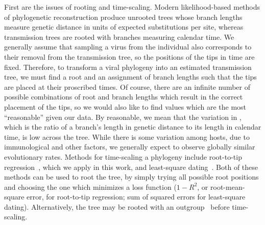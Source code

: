 First are the issues of rooting and time-scaling. Modern likelihood-based
methods of phylogenetic reconstruction produce unrooted trees whose branch
lengths measure genetic distance in units of expected substitutions per site,
whereas transmission trees are rooted with branches measuring calendar time. We
generally assume that sampling a virus from the individual also corresponds to
their removal from the transmission tree, so the
positions of the tips in time are fixed. Therefore, to transform a viral
phylogeny into an estimated transmission tree, we must find a root and an
assignment of branch lengths such that the tips are placed at their proscribed
times. Of course, there are an infinite number of possible combinations of root
and branch lengths which result in the correct placement of the tips, so we
would also like to find values which are the most ``reasonable'' given our
data. By reasonable, we mean that the variation in ,
which is the ratio of a branch's length in genetic distance to its length in
calendar time, is low across the tree. While there is some variation among
hosts, due to immunological and other factors, we generally expect to observe
globally similar evolutionary rates. Methods for time-scaling a phylogeny
include root-to-tip regression~\autocite{shankarappa1999consistent,
korber2000timing, drummond2003inference}, which we apply in this work, and
least-square dating~\autocite{to2015fast}. Both of these methods can be used to
root the tree, by simply trying all possible root positions and choosing the
one which minimizes a loss function ($1-R^2$, or root-mean-square error, for
root-to-tip regression; sum of squared errors for least-square dating).
Alternatively, the tree may be rooted with an outgroup~\autocite{li1988rates}
before time-scaling.

